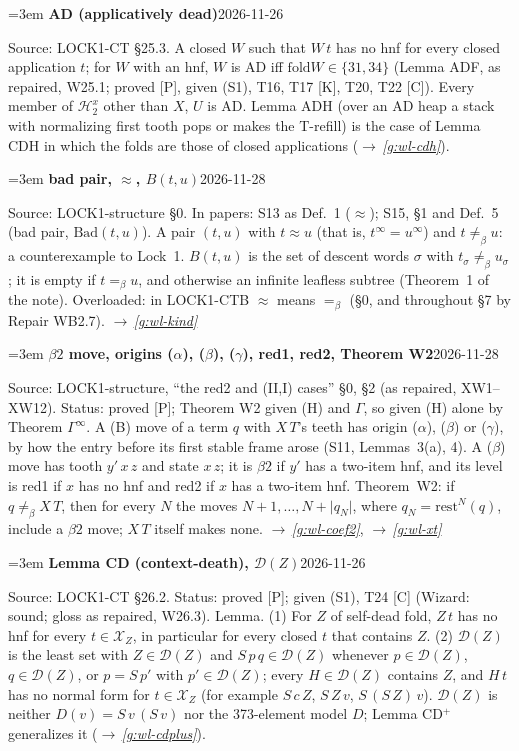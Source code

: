 \documentclass[11pt]{amsart}
\makeatletter
\newcommand{\conv}{=_\beta}
\newcommand{\sz}[1]{\lvert#1\rvert}
\newcommand{\rest}{\mathrm{rest}}
\newcommand{\fold}{\mathrm{fold}}
\newcommand{\Hc}{\mathcal H}
\newcounter{sense}
\newenvironment{entry}[3]{%
  \par\addvspace{\medskipamount}\noindent\phantomsection
  \def\@currentlabel{#2}\label{#1}\setcounter{sense}{0}\raggedright\emergencystretch=3em%
  \textbf{#2}\hfill{\footnotesize\textsf{#3}}\par\nopagebreak\noindent\ignorespaces}%
  {\par}
\newcommand{\src}[1]{\textsf{Source:} #1.\enskip}
\newcommand{\status}[1]{\textsf{Status:} #1.\enskip}
\newcommand{\appears}[1]{\textsf{In papers:} #1.\enskip}
\renewcommand{\see}[1]{$\rightarrow$\,\emph{\ref{#1}}}
\makeatother
\begin{document}
\begin{entry}{g:wl-ad}{AD (applicatively dead)}{2026-11-26}
\src{LOCK1-CT \S25.3}
A closed $W$ such that $W\,t$ has no hnf for every closed application $t$; for $W$ with an hnf, $W$ is
AD iff $\fold W\in\{31,34\}$ (Lemma ADF, as repaired, W25.1; proved [P], given (S1), T16, T17 [K],
T20, T22 [C]). Every member of $\Hc^{x}_2$ other than $X$, $U$ is AD. Lemma ADH (over an AD heap a stack
with normalizing first tooth pops or makes the T-refill) is the case of Lemma CDH in which the folds
are those of closed applications (\see{g:wl-cdh}).
\end{entry}

\begin{entry}{g:wl-bad-pair}{bad pair, $\approx$, $B(t,u)$}{2026-11-28}
\src{LOCK1-structure \S0}
\appears{S13 as Def.~1 ($\approx$); S15, \S1 and Def.~5 (bad pair, $\mathrm{Bad}(t,u)$)}
A pair $(t,u)$ with $t\approx u$ (that is, $t^\infty=u^\infty$) and $t\not\conv u$: a counterexample
to Lock~1. $B(t,u)$ is the set of descent words $\sigma$ with $t_\sigma\not\conv u_\sigma$; it is empty
if $t\conv u$, and otherwise an infinite leafless subtree (Theorem~1 of the note). Overloaded: in LOCK1-CTB $\approx$ means $\conv$
(\S0, and throughout \S7 by Repair WB2.7). \see{g:wl-kind}
\end{entry}

\begin{entry}{g:wl-beta2}{$\beta2$ move, origins ($\alpha$), ($\beta$), ($\gamma$), red1, red2, Theorem W2}{2026-11-28}
\src{LOCK1-structure, ``the red2 and (II,I) cases'' \S0, \S2 (as repaired, XW1--XW12)}
\status{proved [P]; Theorem W2 given (H) and $\Gamma$, so given (H) alone by Theorem $\Gamma^\infty$}
A (B) move of a term $q$ with $X\,T$'s teeth has origin ($\alpha$), ($\beta$) or ($\gamma$), by how the
entry before its first stable frame arose (S11, Lemmas~3(a), 4). A ($\beta$) move has tooth $y'\,x\,z$
and state $x\,z$; it is $\beta2$ if $y'$ has a two-item hnf, and its level is red1 if $x$ has no hnf
and red2 if $x$ has a two-item hnf. Theorem~W2: if $q\not\conv X\,T$, then for every $N$ the moves
$N+1,\dots,N+\sz{q_N}$, where $q_N=\rest^N(q)$, include a $\beta2$ move; $X\,T$ itself makes none. \see{g:wl-coef2}, \see{g:wl-xt}
\end{entry}

\begin{entry}{g:wl-cd}{Lemma CD (context-death), $\mathcal D(Z)$}{2026-11-26}
\src{LOCK1-CT \S26.2}
\status{proved [P]; given (S1), T24 [C] (Wizard: sound; gloss as repaired, W26.3)}
Lemma. (1) For $Z$ of self-dead fold, $Z\,t$ has no hnf for every $t\in\mathcal X_Z$, in particular for
every closed $t$ that contains $Z$. (2) $\mathcal D(Z)$ is the least set with $Z\in\mathcal D(Z)$ and
$S\,p\,q\in\mathcal D(Z)$ whenever $p\in\mathcal D(Z)$, $q\in\mathcal D(Z)$, or $p=S\,p'$ with
$p'\in\mathcal D(Z)$; every $H\in\mathcal D(Z)$ contains $Z$, and $H\,t$ has no normal form for
$t\in\mathcal X_Z$ (for example $S\,c\,Z$, $S\,Z\,v$, $S\,(S\,Z)\,v$). $\mathcal D(Z)$ is neither
$D(v)=S\,v\,(S\,v)$ nor the 373-element model $D$; Lemma CD$^{+}$ generalizes it (\see{g:wl-cdplus}).
\end{entry}
\end{document}
